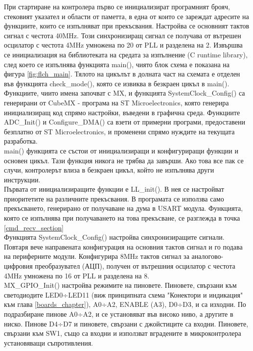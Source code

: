 При стартиране на контролера първо се инициализират програмният брояч, стековият указател и области от паметта, в една от които се зареждат адресите на функциите, които се изпълняват при прекъсвания. Настройва се основният тактов сигнал с честота 40MHz. Този синхронизиращ сигнал се получава от вътрешен осцилатор с честота 4MHz умножена по 20 от PLL и разделена на 2. Извършва се инициализация на библиотеката на средата за изпълнение (C runtime library), след което се изпълнява функцията main(), чиято блок схема е показана на фигура \ref{fig:flch_main}. Тялото на цикълът в долната част на схемата е отделен във функцията check\_mode(), която се извиква в безкраен цикъл в main(). Функциите, чиито имена започват с MX, и функцията SystemClock\_Config() са генерирани от CubeMX - програма на ST Microelectronics, която генерира инициализиращ код спрямо настройки, въведени в графична среда. Функциите ADC\_Init() и Configure\_DMA() са взети от примерни програми, предоставени безплатно от ST Microelectronics, и променени спрямо нуждите на текущата разработка.\\
\indent{}
main() функцията се състои от инициализиращи и конфигуриращи функции и основен цикъл. Тази функция никога не трябва да завърши. Ако това все пак се случи, контролерът влиза в безкраен цикъл, който не изпълнява други инструкции.\\
\indent{}
Първата от инициализиращите функции е LL\_init(). В нея се настройват приоритетите на различните прекъсвания. В програмата се използва само прекъсването, генерирано от получаване на дума в USART модула. Функцията, която се изпълнява при получаването на това прекъсване, се разглежда в точка \ref{cmd_recv_section}\\
\indent{}
Функцията SystemClock\_Config() настройва синхронизиращите сигнали. Повтаря вече направената конфигурация на основния тактов сигнал и го подава на периферните модули. Конфигурира 8MHz тактов сигнал за аналогово-цифровия преобразувател (АЦП), получен от вътрешния осцилатор с честота 4MHz умножена по 16 от PLL и разделена на 8.\\
\indent{}
MX\_GPIO\_Init() настройва режимите на пиновете. Пиновете, свързани към светодиодите LED0÷LED11 (виж принципната схема "Конектори и индикация" към глава \ref{boards_chapter}), A0÷A2, ENABLE (A3), D0÷D3,  и  са изходни. По подразбиране пинове A0÷A2,  и  се установяват във високо ниво, а другите в ниско. Пинове D4÷D7 и пиновете, свързани с джойстиците са входни. Пиновете, свързани към SW1, също са входни и използват вградените в микроконтролера установяващи съпротивления.\\
